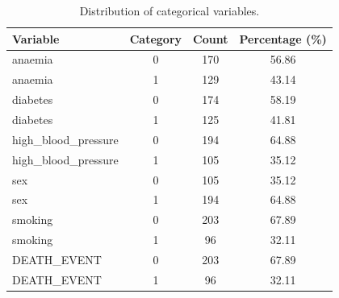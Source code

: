 \begin{table}[H]
\centering
\caption{Distribution of categorical variables.}
\label{tab:categorical_stats}
\begin{tabular*}{\textwidth}{@{\extracolsep{\fill}}lccc}
\toprule
Variable & Category & Count & Percentage (\%) \\
\midrule
anaemia & 0 & 170 & 56.86 \\
anaemia & 1 & 129 & 43.14 \\
diabetes & 0 & 174 & 58.19 \\
diabetes & 1 & 125 & 41.81 \\
high\_blood\_pressure & 0 & 194 & 64.88 \\
high\_blood\_pressure & 1 & 105 & 35.12 \\
sex & 0 & 105 & 35.12 \\
sex & 1 & 194 & 64.88 \\
smoking & 0 & 203 & 67.89 \\
smoking & 1 & 96 & 32.11 \\
DEATH\_EVENT & 0 & 203 & 67.89 \\
DEATH\_EVENT & 1 & 96 & 32.11 \\
\bottomrule
\end{tabular*}
\end{table}





